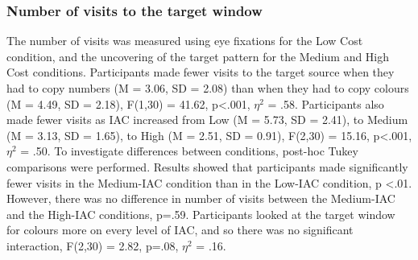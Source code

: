 \subsubsection{Number of visits to the target window}
The number of visits was measured using eye fixations for the Low Cost condition, and the uncovering of the target pattern for the Medium and High Cost conditions. Participants made fewer visits to the target source when they had to copy numbers (M = 3.06, SD = 2.08) than when they had to copy colours (M = 4.49, SD = 2.18), F(1,30) = 41.62, p<.001, $\eta^2$  = .58. Participants also made fewer visits as IAC increased from Low (M = 5.73, SD = 2.41), to Medium (M = 3.13, SD = 1.65), to High (M = 2.51, SD = 0.91), F(2,30) = 15.16, p<.001, $\eta^2$  = .50. To investigate differences between conditions, post-hoc Tukey comparisons were performed. Results showed that participants made significantly fewer visits in the Medium-IAC condition than in the Low-IAC condition, p <.01. However, there was no difference in number of visits between the Medium-IAC and the High-IAC conditions, p=.59. Participants looked at the target window for colours more on every level of IAC, and so there was no significant interaction, F(2,30) = 2.82, p=.08, $\eta^2$  = .16. 

